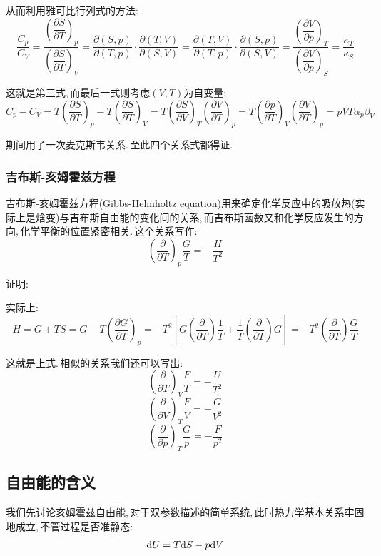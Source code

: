 从而利用雅可比行列式的方法:
\[\frac{C_{p}}{C_{V}}=\frac{\left(\dfrac{\partial S}{\partial T}\right)_p}{\left(\dfrac{\partial S}{\partial T}\right)_V}=\frac{\partial(S,p)}{\partial(T,p)}\cdot\frac{\partial(T,V)}{\partial(S,V)}=\frac{\partial(T,V)}{\partial(T,p)}\cdot\frac{\partial(S,p)}{\partial(S,V)}=\frac{\left(\dfrac{\partial V}{\partial p}\right)_T}{\left(\dfrac{\partial V}{\partial p}\right)_S}=\frac{\kappa_T}{\kappa_S}\]

这就是第三式,\,而最后一式则考虑$(V,T)$为自变量:
\[C_p-C_V=T\left(\frac{\partial S}{\partial T}\right)_p-T\left(\frac{\partial S}{\partial T}\right)_V=T\left(\frac{\partial S}{\partial V}\right)_T\left(\frac{\partial V}{\partial T}\right)_p=T\left(\frac{\partial p}{\partial T}\right)_V\left(\frac{\partial V}{\partial T}\right)_p=pVT\alpha_p\beta_V\]

期间用了一次麦克斯韦关系.\,至此四个关系式都得证.

\vspace{0.5cm}
\subsubsection{\hei 吉布斯-亥姆霍兹方程}

吉布斯-亥姆霍兹方程(Gibbs-Helmholtz equation)用来确定化学反应中的吸放热(实际上是焓变)与吉布斯自由能的变化间的关系,\,而吉布斯函数又和化学反应发生的方向,\,化学平衡的位置紧密相关.\,这个关系写作:
\[\left(\frac{\partial}{\partial T}\right)_p \frac{G}{T}=-\frac{H}{T^2}\]

\vspace{0.3cm}
{\hei 证明:}

实际上:
\[H=G+TS=G-T\left(\frac{\partial G}{\partial T}\right)_p=-T^2[G\left(\frac{\partial}{\partial T}\right)\frac{1}{T}+\frac{1}{T}\left(\frac{\partial}{\partial T}\right)G]=-T^2\left(\frac{\partial}{\partial T}\right)\frac{G}{T}\]

这就是上式.\,相似的关系我们还可以写出:
\[\left(\frac{\partial}{\partial T}\right)_V \frac{F}{T}=-\frac{U}{T^2}\]
\[\left(\frac{\partial}{\partial V}\right)_T \frac{F}{V}=-\frac{G}{V^2}\]
\[\left(\frac{\partial}{\partial p}\right)_T \frac{G}{p}=-\frac{F}{p^2}\]

\subsection{自由能的含义}

我们先讨论亥姆霍兹自由能,\,对于双参数描述的简单系统,\,此时热力学基本关系牢固地成立,\,不管过程是否准静态:
\[\textrm{d} U=T\textrm{d} S-p\textrm{d} V\]

